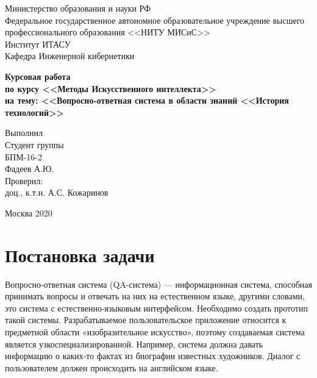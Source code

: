 \documentclass[a4paper,12pt,preview]{report} %
\begin{document}
	
	\begin{center}
		Министерство образования и науки РФ \\
		Федеральное государственное автономное образовательное учреждение высшего профессионального образования <<НИТУ МИСиС>>\\
		Институт ИТАСУ\\
		Кафедра Инженерной кибернетики\\
	\end{center}
	
	
	\vfill
	
	\begin{center}
		\Large\textbf{Курсовая работа \\
			по курсу <<Методы Искусственного интеллекта>> \\
			на тему: <<Вопросно-ответная система в области знаний <<История технологий>>}
	\end{center}
	
	\vfill
	
	\begin{FlushRight}
		Выполнил\\
		Студент группы \\
		БПМ-16-2 \\
		Фадеев А.Ю. \\
		[\baselineskip]
		Проверил: \\
		доц., к.т.н. А.С. Кожаринов \\
		[9\baselineskip]
	\end{FlushRight}
	
	
	\begin{center}
		Москва 2020
	\end{center}
	
	\thispagestyle{empty}
	\newpage
	
	\tableofcontents
	\newpage
	
	\chapter{Постановка задачи}
	
	Вопросно-ответная система (QA-система) — информационная система, способная принимать вопросы и отвечать на них на естественном языке, другими словами, это система с естественно-языковым интерфейсом.
	Необходимо создать прототип такой системы. Разрабатываемое пользовательское приложение относится к предметной области «изобразительное искусство», поэтому создаваемая система является узкоспециализированной. Например, система должна давать информацию о каких-то фактах из биографии известных художников.
	Диалог с пользователем должен происходить на английском языке.
	
\end{document}
